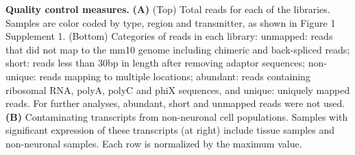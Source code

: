 \textbf{Quality control measures.} \textbf{(A)} (Top) Total reads for each of the libraries. Samples are color coded by type, region and transmitter, as shown in Figure 1 Supplement 1. (Bottom) Categories of reads in each library: unmapped: reads that did not map to the mm10 genome including chimeric and back-spliced reads; short: reads less than 30bp in length after removing adaptor sequences; non-unique: reads mapping to multiple locations; abundant: reads containing ribosomal RNA, polyA, polyC and phiX sequences, and unique: uniquely mapped reads. For further analyses, abundant, short and unmapped reads were not used.
\textbf{(B)} Contaminating transcripts from non-neuronal cell populations. Samples with significant expression of these transcripts (at right) include tissue samples and non-neuronal samples. Each row is normalized by the maximum value. 
